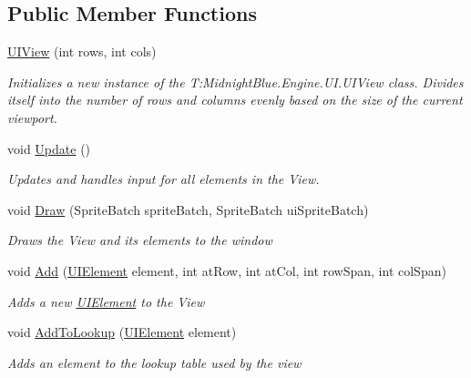 \subsection*{Public Member Functions}
\begin{DoxyCompactItemize}
\item 
\hyperlink{class_midnight_blue_1_1_engine_1_1_u_i_1_1_u_i_view_a6b2875471139a91f14655d1665ebad21}{U\+I\+View} (int rows, int cols)
\begin{DoxyCompactList}\small\item\em Initializes a new instance of the T\+:\+Midnight\+Blue.\+Engine.\+U\+I.\+U\+I\+View class. Divides itself into the number of rows and columns evenly based on the size of the current viewport. \end{DoxyCompactList}\item 
void \hyperlink{class_midnight_blue_1_1_engine_1_1_u_i_1_1_u_i_view_aba1d6f02ef75ed1a595f448acef47915}{Update} ()
\begin{DoxyCompactList}\small\item\em Updates and handles input for all elements in the View. \end{DoxyCompactList}\item 
void \hyperlink{class_midnight_blue_1_1_engine_1_1_u_i_1_1_u_i_view_a167c98165d6ed4031b371c6a92b95a1e}{Draw} (Sprite\+Batch sprite\+Batch, Sprite\+Batch ui\+Sprite\+Batch)
\begin{DoxyCompactList}\small\item\em Draws the View and its elements to the window \end{DoxyCompactList}\item 
void \hyperlink{class_midnight_blue_1_1_engine_1_1_u_i_1_1_u_i_view_a46705046c44aec1a6ca1d99a2d39194d}{Add} (\hyperlink{class_midnight_blue_1_1_engine_1_1_u_i_1_1_u_i_element}{U\+I\+Element} element, int at\+Row, int at\+Col, int row\+Span, int col\+Span)
\begin{DoxyCompactList}\small\item\em Adds a new \hyperlink{class_midnight_blue_1_1_engine_1_1_u_i_1_1_u_i_element}{U\+I\+Element} to the View \end{DoxyCompactList}\item 
void \hyperlink{class_midnight_blue_1_1_engine_1_1_u_i_1_1_u_i_view_a1f5a8d988b464af5c207b75e0422abc6}{Add\+To\+Lookup} (\hyperlink{class_midnight_blue_1_1_engine_1_1_u_i_1_1_u_i_element}{U\+I\+Element} element)
\begin{DoxyCompactList}\small\item\em Adds an element to the lookup table used by the view \end{DoxyCompactList}\end{DoxyCompactItemize}
